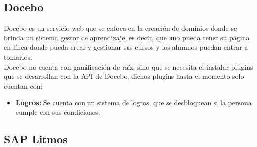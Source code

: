 \begin{multicols}{2}
 \subsection*{Docebo}
    
    Docebo es un servicio web que se enfoca en la creación de dominios donde se brinda un sistema gestor de aprendizaje, es decir, que uno pueda tener su página en línea donde pueda crear y gestionar sus cursos y los alumnos puedan entrar a tomarlos.\\
    
    \noindent Docebo no cuenta con gamificación de raíz, sino que se necesita el instalar plugins que se desarrollan con la API de Docebo, dichos plugins hasta el momento solo cuentan con:\\
    \begin{itemize}
        \item \textbf{Logros: } Se cuenta con un sistema de logros, que se desbloquean si la persona cumple con sus condiciones.
    \end{itemize}
    
    
\begin{comment}
    \subsubsection{Ventajas y desventajas}
    \begin{multicols}{2}
        \textbf{Ventajas}\\
        \begin{Titemize}
            \Titem{ Te permite tener tu dominio en internet para no meterte en problemas de servidores.}
            \Titem{ Puedes extender la funcionalidad inicial con componentes externos.}
        \end{Titemize}
        \columnbreak 
        \textbf{Desventajas}\\ 
        \begin{Titemize}
            \Titem{ Solo acepta cuentas con correos de empresas o instituciones registradas.}
            \Titem{ . }
        \end{Titemize}
    \end{multicols}
\end{comment}    
    
    

\subsection*{SAP Litmos}
    

\end{multicols}
